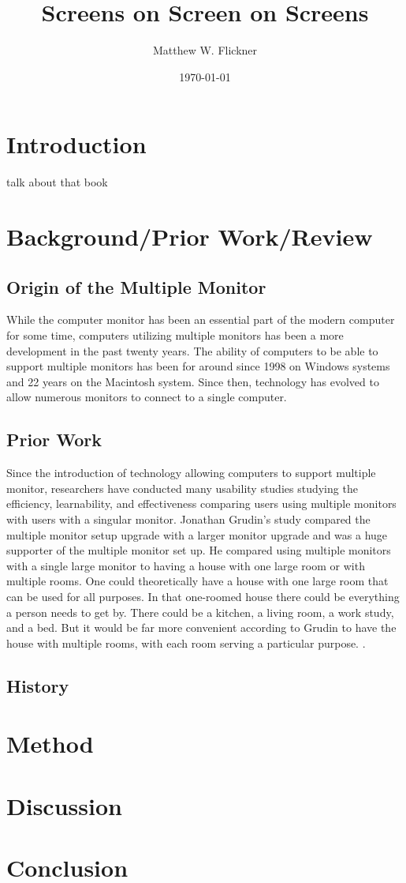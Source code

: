 \documentclass[a4paper]{article}
\title{Screens on Screen on Screens}
\author{Matthew W. Flickner}
\date{\today}
\begin{document}
\maketitle

\begin{abstract}
\end{abstract}

\section{Introduction}

talk about that book

\section{Background/Prior Work/Review}
\subsection{Origin of the Multiple Monitor}
While the computer monitor has been an essential part of the modern computer for some time, computers utilizing multiple monitors has been a more development in the past twenty years. The ability of computers to be able to support multiple monitors has been for around since 1998 on Windows systems and 22 years on the Macintosh system.\cite{Grudin}  Since then, technology has evolved to allow numerous monitors to connect to a single computer.

\subsection{Prior Work}
Since the introduction of technology allowing computers to support multiple monitor, researchers have conducted many usability studies studying the efficiency, learnability, and effectiveness comparing users using multiple monitors with users with a singular monitor. Jonathan Grudin's study compared the multiple monitor setup upgrade with a larger monitor upgrade and was a huge supporter of the multiple monitor set up. He compared using multiple monitors with a single large monitor to having a house with one large room or with multiple rooms. One could theoretically have a house with one large room that can be used for all purposes. In that one-roomed house there could be everything a person needs to get by. There could be a kitchen, a living room, a work study, and a bed. But it would be far more convenient according to Grudin to have the house with multiple rooms, with each room serving a particular purpose. \cite{Grudin}.


\subsection{History}

\section{Method}
\section{Discussion}
\section{Conclusion}



\end{document}
